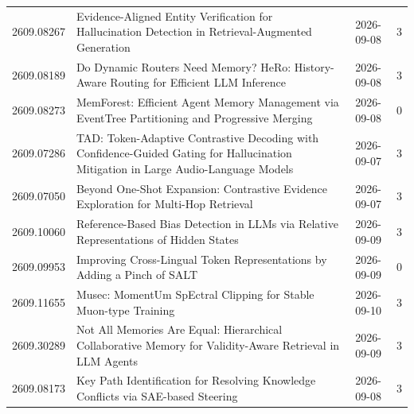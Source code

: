 \begin{longtable}{p{2.1cm}p{9.6cm}cc}
2609.08267 & Evidence-Aligned Entity Verification for Hallucination Detection in Retrieval-Augmented Generation & 2026-09-08 & 3 \\
2609.08189 & Do Dynamic Routers Need Memory? HeRo: History-Aware Routing for Efficient LLM Inference & 2026-09-08 & 3 \\
2609.08273 & MemForest: Efficient Agent Memory Management via EventTree Partitioning and Progressive Merging & 2026-09-08 & 0 \\
2609.07286 & TAD: Token-Adaptive Contrastive Decoding with Confidence-Guided Gating for Hallucination Mitigation in Large Audio-Language Models & 2026-09-07 & 3 \\
2609.07050 & Beyond One-Shot Expansion: Contrastive Evidence Exploration for Multi-Hop Retrieval & 2026-09-07 & 3 \\
2609.10060 & Reference-Based Bias Detection in LLMs via Relative Representations of Hidden States & 2026-09-09 & 3 \\
2609.09953 & Improving Cross-Lingual Token Representations by Adding a Pinch of SALT & 2026-09-09 & 0 \\
2609.11655 & Musec: MomentUm SpEctral Clipping for Stable Muon-type Training & 2026-09-10 & 3 \\
2609.30289 & Not All Memories Are Equal: Hierarchical Collaborative Memory for Validity-Aware Retrieval in LLM Agents & 2026-09-09 & 3 \\
2609.08173 & Key Path Identification for Resolving Knowledge Conflicts via SAE-based Steering & 2026-09-08 & 3 \\
\bottomrule\end{longtable}
